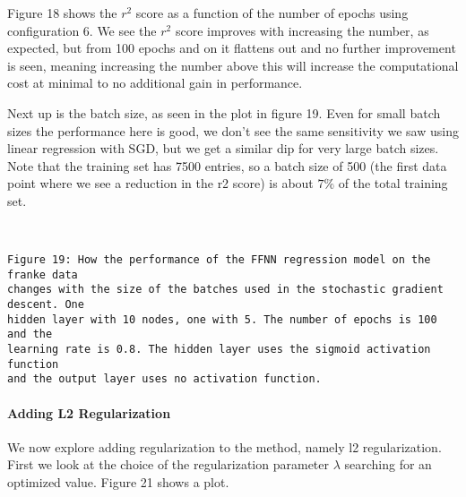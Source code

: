 \documentclass[11pt]{article}
\begin{document}
    Figure 18 shows the \(r^2\) score as a function of the number of epochs
using configuration 6. We see the \(r^2\) score improves with increasing
the number, as expected, but from 100 epochs and on it flattens out and
no further improvement is seen, meaning increasing the number above this
will increase the computational cost at minimal to no additional gain in
performance.

Next up is the batch size, as seen in the plot in figure 19. Even for
small batch sizes the performance here is good, we don't see the same
sensitivity we saw using linear regression with SGD, but we get a
similar dip for very large batch sizes. Note that the training set has
7500 entries, so a batch size of 500 (the first data point where we see a
reduction in the r2 score) is about \(7\%\) of the total training set.

    \begin{center}
    \end{center}
    { \hspace*{\fill} \\}
    
    \begin{Verbatim}[commandchars=\\\{\}]
Figure 19: How the performance of the FFNN regression model on the franke data
changes with the size of the batches used in the stochastic gradient descent. One 
hidden layer with 10 nodes, one with 5. The number of epochs is 100 and the 
learning rate is 0.8. The hidden layer uses the sigmoid activation function 
and the output layer uses no activation function.
    \end{Verbatim}


    \hypertarget{adding-l2-regularization}{%
\paragraph{Adding L2 Regularization}\label{adding-l2-regularization}}


 We now explore adding regularization to the method, namely l2
regularization. First we look at the choice of the regularization
parameter \(\lambda\) searching for an optimized value. Figure 21 shows
a plot.

    \begin{center}
    \end{center}
    { \hspace*{\fill} \\}
    
\end{document}
